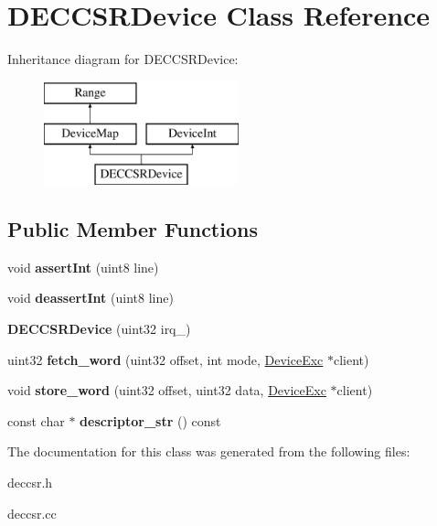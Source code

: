\hypertarget{classDECCSRDevice}{
\section{DECCSRDevice Class Reference}
\label{classDECCSRDevice}
}
Inheritance diagram for DECCSRDevice:\begin{figure}[H]
\begin{center}
\leavevmode
\includegraphics[height=3cm]{classDECCSRDevice}
\end{center}
\end{figure}
\subsection*{Public Member Functions}
\begin{DoxyCompactItemize}
\item 
\hypertarget{classDECCSRDevice_ab00f38e1cd68a11d16e3d5c9ca381af1}{
void {\bfseries assertInt} (uint8 line)}
\label{classDECCSRDevice_ab00f38e1cd68a11d16e3d5c9ca381af1}

\item 
\hypertarget{classDECCSRDevice_a99bb4df90882834bd5c5bcb06457d03d}{
void {\bfseries deassertInt} (uint8 line)}
\label{classDECCSRDevice_a99bb4df90882834bd5c5bcb06457d03d}

\item 
\hypertarget{classDECCSRDevice_a452a8f52b933794f9162ead84814fcd4}{
{\bfseries DECCSRDevice} (uint32 irq\_\-)}
\label{classDECCSRDevice_a452a8f52b933794f9162ead84814fcd4}

\item 
\hypertarget{classDECCSRDevice_a6cc82fe176a5a4e46cf4097ec62f22a0}{
uint32 {\bfseries fetch\_\-word} (uint32 offset, int mode, \hyperlink{classDeviceExc}{DeviceExc} $\ast$client)}
\label{classDECCSRDevice_a6cc82fe176a5a4e46cf4097ec62f22a0}

\item 
\hypertarget{classDECCSRDevice_a9213f37a4ca901a32d22cb61a9cb9d81}{
void {\bfseries store\_\-word} (uint32 offset, uint32 data, \hyperlink{classDeviceExc}{DeviceExc} $\ast$client)}
\label{classDECCSRDevice_a9213f37a4ca901a32d22cb61a9cb9d81}

\item 
\hypertarget{classDECCSRDevice_ada6ce141e4c58bcf6998c00d109c8140}{
const char $\ast$ {\bfseries descriptor\_\-str} () const }
\label{classDECCSRDevice_ada6ce141e4c58bcf6998c00d109c8140}

\end{DoxyCompactItemize}


The documentation for this class was generated from the following files:\begin{DoxyCompactItemize}
\item 
deccsr.h\item 
deccsr.cc\end{DoxyCompactItemize}
